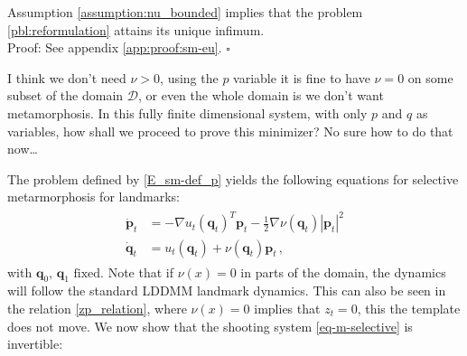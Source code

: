 \documentclass[runningheads]{llncs}
\begin{document}
\begin{theorem}\label{sm-eu}
Assumption \ref{assumption:nu_bounded} implies that the problem
\eqref{pbl:reformulation} attains its unique infimum.\\

Proof: See appendix \ref{app:proof:sm-eu}.
{\hfill $\square$}
\end{theorem}
{\color{red} I think we don't need $\nu>0$, using the $p$ variable it is fine to have $\nu=0$ on some subset of the domain $\mathcal D$, or even the whole domain is we don't want metamorphosis. 
In this fully finite dimensional system, with only $p$ and $q$ as variables, how shall we proceed to prove this minimizer? No sure how to do that now\dots
}

The problem defined by \eqref{E_sm-def_p} yields the following equations for
selective metarmorphosis for landmarks:
\begin{align}
  \begin{split}
  \dot{\mathbf p}_t &= - \nabla u_t(\mathbf q_t)^T \mathbf p_t - \frac12
  \nabla \nu(\mathbf q_t ) |\mathbf p_t|^2\\ \dot{\mathbf q}_t &= u_t(\mathbf q_t) +
  \nu(\mathbf q_t)\mathbf p_t \,,
\end{split}
  \label{eq-m-selective}
\end{align}
with $\mathbf q_0,\, \mathbf q_1 \text{ fixed}$. Note that if $\nu(x)=0$ in
parts of the domain, the dynamics will follow the standard LDDMM landmark
dynamics. This can also be seen in the relation \eqref{zp_relation}, where
$\nu(x)=0$  implies that $z_t=0$, this the template does not move. We now show
that the shooting system \eqref{eq-m-selective} is invertible:
\end{document}
